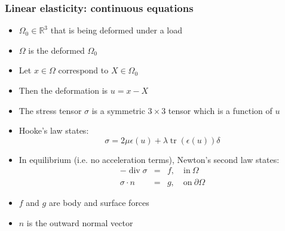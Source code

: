\begin{frame}
\frametitle{Linear elasticity: continuous equations}
\begin{itemize}
\item  $\Omega_0 \in \mathbb{R}^3$ that is being deformed under a load
\item  $\Omega$ is the deformed $\Omega_0$
\item  Let $x\in \Omega$ correspond to $X\in\Omega_0$
\item  Then the deformation is $ u = x - X$
\item  The stress tensor $\sigma$ is a symmetric $3\times 3$ tensor which is a function of $u$
\item Hooke's law states:
\[
\sigma = 2 \mu \epsilon(u) + \lambda \operatorname{tr}(\epsilon(u)) \delta
\]
\item  In equilibrium (i.e. no acceleration terms), Newton's second law states:
\begin{eqnarray*}
-\operatorname{div} \sigma &=& f, \quad\mbox{in}\ \Omega   \\
\sigma \cdot n &=& g, \quad\mbox{on}\ \partial \Omega
\end{eqnarray*}
\item $f$ and $g$ are body and surface forces
\item $n$ is the outward normal vector
\end{itemize}

\end{frame}

